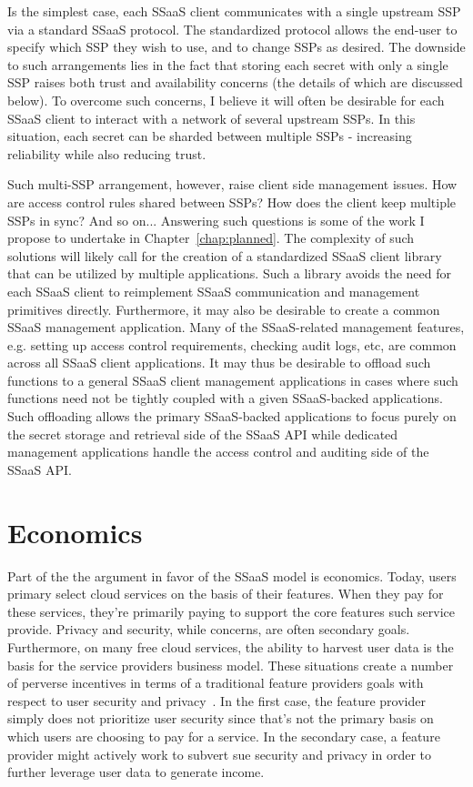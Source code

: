 Is the simplest case, each SSaaS client communicates with a single
upstream SSP via a standard SSaaS protocol. The standardized protocol
allows the end-user to specify which SSP they wish to use, and to
change SSPs as desired. The downside to such arrangements lies in the
fact that storing each secret with only a single SSP raises both trust
and availability concerns (the details of which are discussed
below). To overcome such concerns, I believe it will often be
desirable for each SSaaS client to interact with a network of several
upstream SSPs. In this situation, each secret can be sharded between
multiple SSPs - increasing reliability while also reducing trust.

Such multi-SSP arrangement, however, raise client side management
issues. How are access control rules shared between SSPs? How does the
client keep multiple SSPs in sync? And so on... Answering such
questions is some of the work I propose to undertake in
Chapter~\ref{chap:planned}. The complexity of such solutions will
likely call for the creation of a standardized SSaaS client library
that can be utilized by multiple applications. Such a library avoids
the need for each SSaaS client to reimplement SSaaS communication and
management primitives directly. Furthermore, it may also be desirable
to create a common SSaaS management application. Many of the
SSaaS-related management features, e.g. setting up access control
requirements, checking audit logs, etc, are common across all SSaaS
client applications. It may thus be desirable to offload such
functions to a general SSaaS client management applications in cases
where such functions need not be tightly coupled with a given
SSaaS-backed applications. Such offloading allows the primary
SSaaS-backed applications to focus purely on the secret storage and
retrieval side of the SSaaS API while dedicated management
applications handle the access control and auditing side of the SSaaS
API.

\section{Economics}
\label{chap:ssaas:economics}

Part of the the argument in favor of the SSaaS model is
economics. Today, users primary select cloud services on the basis of
their features. When they pay for these services, they're primarily
paying to support the core features such service provide. Privacy and
security, while concerns, are often secondary goals. Furthermore, on
many free cloud services, the ability to harvest user data is the
basis for the service providers business model. These situations
create a number of perverse incentives in terms of a traditional
feature providers goals with respect to user security and
privacy~\cite{anderson2001}. In the first case, the feature provider
simply does not prioritize user security since that's not the primary
basis on which users are choosing to pay for a service. In the
secondary case, a feature provider might actively work to subvert sue
security and privacy in order to further leverage user data to
generate income.

